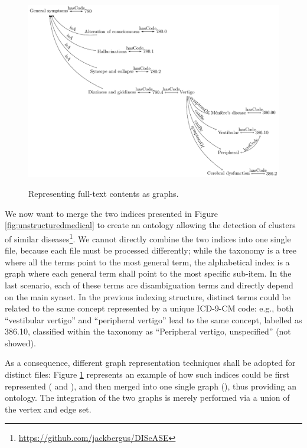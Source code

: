 \begin{figure}
	
	\begin{minipage}[t]{\textwidth}
		\includegraphics[width=\textwidth]{fig/01dataint/04_fromfulltext03.pdf}
		\label{fig:astaxonomy2}
	\end{minipage}
	\caption{Representing full-text contents as graphs.}
	\label{fig:mergedgraphsfromfull}
\end{figure}
\begin{example}
We now want to merge the two indices presented in Figure \ref{fig:unstructuredmedical} to create an ontology allowing the detection of clusters of similar diseases\footnote{\url{https://github.com/jackbergus/DISeASE}}. We cannot directly combine the two indices into one single file, because each file must be processed differently; while the taxonomy is a tree where all the terms point to the most general term, the alphabetical index is a graph where each general term shall point to the most specific sub-item. In the last scenario, each of these terms are disambiguation terms and directly depend on the main synset. In the previous indexing structure, distinct terms could be related to the same concept represented by a unique ICD-9-CM code: e.g., both ``vestibular vertigo'' and ``peripheral vertigo'' lead to the same concept, labelled as 386.10, classified within the taxonomy as ``Peripheral vertigo, unspecified'' (not showed).
  
  As a consequence, different graph representation techniques shall be adopted for distinct files: Figure \ref{fig:mergedgraphsfromfull} represents an example of how such indices could be first represented ( and ), and then merged into one single graph (), thus providing an ontology. The integration of the two graphs is merely performed via a union of the vertex and edge set.
\end{example}


